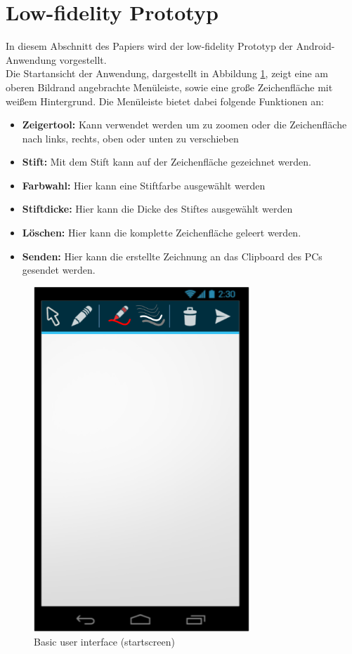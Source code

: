 \documentclass{chi-ext}
\begin{document}
\section{Low-fidelity Prototyp}
In diesem Abschnitt des Papiers wird der low-fidelity Prototyp der Android-Anwendung vorgestellt.\\

Die Startansicht der Anwendung, dargestellt in Abbildung \ref{fig:mockup_startscreen}, zeigt eine am oberen Bildrand angebrachte Menüleiste, sowie eine große Zeichenfläche mit weißem Hintergrund. 
Die Menüleiste bietet dabei folgende Funktionen an:

\begin{itemize}
	\item {\textbf{Zeigertool:} Kann verwendet werden um zu zoomen oder die Zeichenfläche nach links, rechts, oben oder unten zu verschieben}
	\item {\textbf{Stift:} Mit dem Stift kann auf der Zeichenfläche gezeichnet werden.}
	\item {\textbf{Farbwahl:} Hier kann eine Stiftfarbe ausgewählt werden}
	\item {\textbf{Stiftdicke:} Hier kann die Dicke des Stiftes ausgewählt werden}
	\item {\textbf{Löschen:} Hier kann die komplette Zeichenfläche geleert werden.}
	\item {\textbf{Senden:} Hier kann die erstellte Zeichnung an das Clipboard des PCs gesendet werden.}
\end{itemize}

\begin{figure}
  \centering
  \includegraphics[width=230pt]{img/android/mockup_startscreen.png}
  \caption{Basic user interface (startscreen)}
  \label{fig:mockup_startscreen}
\end{figure}
\end{document}
